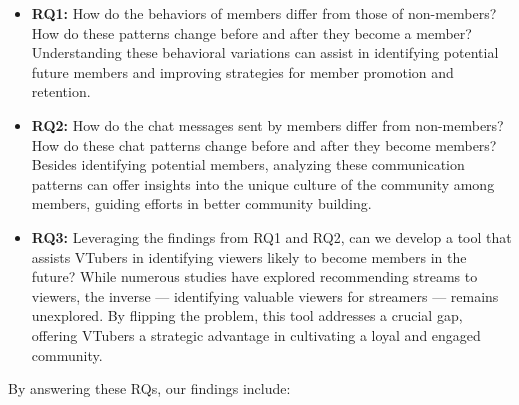 \begin{itemize}[leftmargin=*]
    \item \textbf{RQ1:} How do the behaviors of members differ from those of non-members? How do these patterns change before and after they become a member? Understanding these behavioral variations can assist in identifying potential future members and improving strategies for member promotion and retention.

    \item \textbf{RQ2:} How do the chat messages sent by members differ from non-members? How do these chat patterns change before and after they become members?
    Besides identifying potential members, analyzing these communication patterns can offer insights into the unique culture of the community among members, guiding efforts in better community building.
    
    \item \textbf{RQ3:} Leveraging the findings from RQ1 and RQ2, can we develop a tool that assists VTubers in identifying viewers likely to become members in the future? 
    While numerous studies have explored recommending streams to viewers, the inverse --- identifying valuable viewers for streamers --- remains unexplored. By flipping the problem, this tool addresses a crucial gap, offering VTubers a strategic advantage in cultivating a loyal and engaged community.
\end{itemize}




\noindent
By answering these RQs, our findings include:

